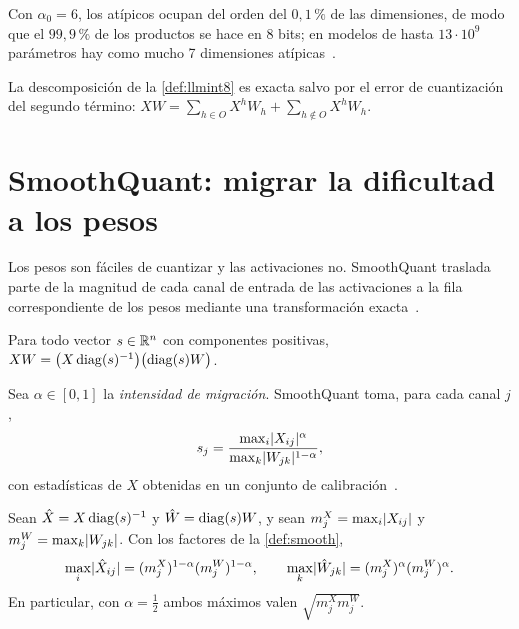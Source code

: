 Con $\alpha_0=6$, los atípicos ocupan del orden del $0{,}1\,\%$ de las dimensiones, de modo que el $99{,}9\,\%$ de los productos se hace en 8 bits; en modelos de hasta $13\cdot 10^{9}$ parámetros hay como mucho 7 dimensiones atípicas~\cite[§3.2]{llmint8}.

\begin{proposicion}\label{prop:descomp}
La descomposición de la \cref{def:llmint8} es exacta salvo por el error de cuantización del segundo término: $XW=\sum_{h\in O}X^{h}W_{h}+\sum_{h\notin O}X^{h}W_{h}$.
\end{proposicion}

\section{SmoothQuant: migrar la dificultad a los pesos}

Los pesos son fáciles de cuantizar y las activaciones no. SmoothQuant traslada parte de la magnitud de cada canal de entrada de las activaciones a la fila correspondiente de los pesos mediante una transformación exacta~\cite[§4]{smoothquant}.

\begin{proposicion}\label{prop:smooth}
Para todo vector $s\in\mathbb{R}^{n}$ con componentes positivas, $XW=\bigl(X\operatorname{diag}(s)^{-1}\bigr)\bigl(\operatorname{diag}(s)W\bigr)$.
\end{proposicion}

\begin{definicion}\label{def:smooth}
Sea $\alpha\in[0,1]$ la \emph{intensidad de migración}. SmoothQuant toma, para cada canal $j$,
\[
s_j=\frac{\max_i\lvert X_{ij}\rvert^{\alpha}}{\max_k\lvert W_{jk}\rvert^{1-\alpha}},
\]
con estadísticas de $X$ obtenidas en un conjunto de calibración~\cite[ec.~4]{smoothquant}.
\end{definicion}

\begin{proposicion}[Equilibrio con $\alpha=\tfrac12$]\label{prop:alfa-medio}
Sean $\hat X=X\operatorname{diag}(s)^{-1}$ y $\hat W=\operatorname{diag}(s)W$, y sean $m^{X}_{j}=\max_i\lvert X_{ij}\rvert$ y $m^{W}_{j}=\max_k\lvert W_{jk}\rvert$. Con los factores de la \cref{def:smooth},
\[
\max_i\lvert\hat X_{ij}\rvert=(m^{X}_{j})^{1-\alpha}(m^{W}_{j})^{1-\alpha},\qquad
\max_k\lvert\hat W_{jk}\rvert=(m^{X}_{j})^{\alpha}(m^{W}_{j})^{\alpha}.
\]
En particular, con $\alpha=\tfrac12$ ambos máximos valen $\sqrt{m^{X}_{j}m^{W}_{j}}$.
\end{proposicion}

